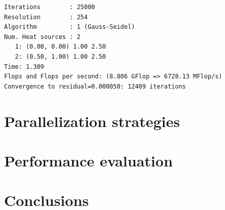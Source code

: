 \begin{verbatim}
Iterations        : 25000
Resolution        : 254
Algorithm         : 1 (Gauss-Seidel)
Num. Heat sources : 2
   1: (0.00, 0.00) 1.00 2.50 
   2: (0.50, 1.00) 1.00 2.50 
Time: 1.309 
Flops and Flops per second: (8.806 GFlop => 6728.13 MFlop/s)
Convergence to residual=0.000050: 12409 iterations
\end{verbatim}


\section{Parallelization strategies}%
\label{sec:parallelization_strategies}

\section{Performance evaluation}%
\label{sec:performance_evaluation}

\section{Conclusions}%
\label{sec:conclusions}







